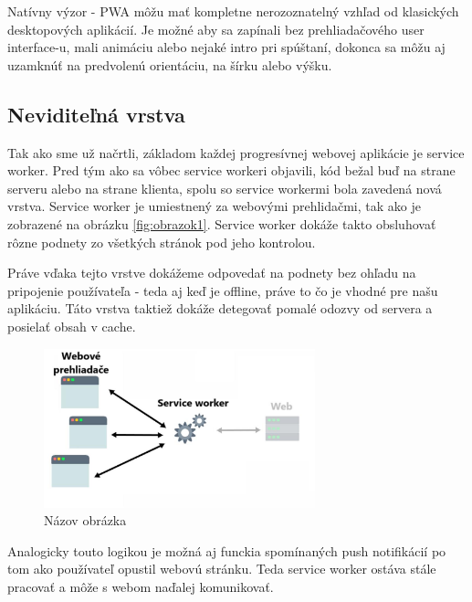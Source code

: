 Natívny výzor - PWA môžu mať kompletne nerozoznatelný vzhľad od klasických desktopových aplikácií. Je možné aby sa zapínali bez prehliadačového
user interface-u, mali animáciu alebo nejaké intro pri spúštaní, dokonca sa môžu aj uzamknúť na predvolenú orientáciu, na šírku alebo výšku.

\subsection{Neviditeľná vrstva}
\label{subsec:neviditeľnávrstva}
Tak ako sme už načrtli, základom každej progresívnej webovej aplikácie je service worker. Pred tým ako sa vôbec service workeri objavili, kód
bežal buď na strane serveru alebo na strane klienta, spolu so service workermi bola zavedená nová vrstva. Service worker je umiestnený za webovými
prehlidačmi, tak ako je zobrazené na obrázku \ref{fig:obrazok1}. Service worker dokáže takto obsluhovať rôzne podnety zo všetkých stránok pod jeho
kontrolou. 

Práve vďaka tejto vrstve dokážeme odpovedať na podnety bez ohľadu na pripojenie používateľa - teda aj keď je offline, práve to čo je vhodné pre
našu aplikáciu. Táto vrstva taktiež dokáže detegovať pomalé odozvy od servera a posielať obsah v cache.

\begin{figure}[H]
  \centering
  \includegraphics[width=0.7\textwidth]{img/image2.pdf}
  \caption{Názov obrázka \cite{Ater2017BuildingPWA}}
  \label{fig:obrazok2}
\end{figure}

Analogicky touto logikou je možná aj funckia spomínaných push notifikácií po tom ako používateľ opustil webovú stránku. Teda service worker ostáva
stále pracovať a môže s webom naďalej komunikovať.


